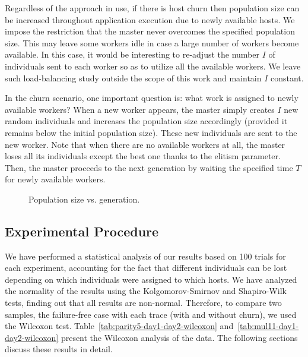 \documentclass[graybox]{sty/svmult}
\begin{document}
Regardless of the approach in use, if there is host churn then population
size can be increased throughout application execution due to newly
available hosts. We impose the restriction that the master never overcomes
the specified population size. This may leave some workers idle in case 
a large number of workers become available. In this case, it would be 
interesting to re-adjust the number $I$ of individuals sent to each worker 
so as to utilize all the available workers. We leave such load-balancing 
study outside the scope of this work and maintain $I$ constant.

In the churn scenario, one important question is: what work is assigned
to newly available workers? When a new worker appears, the master
simply creates $I$ new random individuals and increases the population
size accordingly (provided it remains below the initial population size). 
These new individuals are sent to the new worker. Note that when there are 
no available workers at all, the master loses all its individuals except the 
best one thanks to the elitism parameter. Then, the master proceeds to the 
next generation by waiting the specified time  $T$ for newly available workers.

\begin{figure}
    \begin{center}
    \end{center}
    \caption{\label{fig:population-length}Population size vs. generation.}
\end{figure}

\subsection{Experimental Procedure}
\label{experiments-results}

We have performed a statistical analysis of our results based
on 100 trials for each experiment, accounting for the fact that
different individuals can be lost depending on which individuals were
assigned to which hosts.  We have analyzed the normality
of the results using the Kolgomorov-Smirnov and Shapiro-Wilk tests,
finding out that all results are non-normal. Therefore, to compare two
samples, the failure-free case with each trace (with and without churn),
we used the Wilcoxon test. Table~\ref{tab:parity5-day1-day2-wilcoxon}
and~\ref{tab:mul11-day1-day2-wilcoxon} present the Wilcoxon analysis of
the data. The following sections discuss these results in detail.
\end{document}
